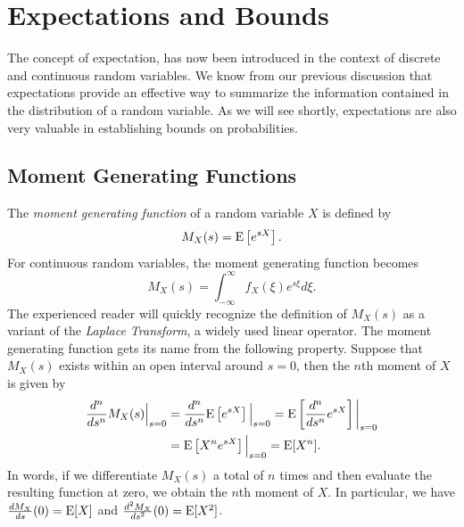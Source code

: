 \chapter{Expectations and Bounds}

The concept of expectation, has now been introduced in the context of discrete and continuous random variables.
We know from our previous discussion that expectations provide an effective way to summarize the information contained in the distribution of a random variable.
As we will see shortly, expectations are also very valuable in establishing bounds on probabilities.


\section{Moment Generating Functions}

The \emph{moment generating function} of a random variable $X$ is defined by
\begin{equation*}
M_X (s) = \mathrm{E} \left[ e^{s X} \right] .
\end{equation*}
For continuous random variables, the moment generating function becomes
\begin{equation*}
M_X (s) = \int_{-\infty}^{\infty} f_X (\xi) e^{s \xi} d\xi .
\end{equation*}
The experienced reader will quickly recognize the definition of $M_X(s)$ as a variant of the \emph{Laplace Transform}, a widely used linear operator.
The moment generating function gets its name from the following property.
Suppose that $M_X(s)$ exists within an open interval around $s = 0$, then the $n$th moment of $X$ is given by
\begin{equation*}
\begin{split}
\frac{d^n}{ds^n} M_X (s) \Big|_{s=0}
&= \frac{d^n}{ds^n} \mathrm{E} \left[ e^{s X} \right] \Big|_{s=0}
= \mathrm{E} \left[ \frac{d^n}{ds^n} e^{s X} \right] \bigg|_{s=0} \\
&= \mathrm{E} \left[ X^n e^{s X} \right] \Big|_{s=0}
= \mathrm{E} [X^n] .
\end{split}
\end{equation*}
In words, if we differentiate $M_X(s)$ a total of $n$ times and then evaluate the resulting function at zero, we obtain the $n$th moment of $X$.
In particular, we have $\frac{d M_X}{ds}(0) = \mathrm{E} [X]$ and $\frac{d^2 M_X}{ds^2}(0) = \mathrm{E} [X^2]$.

